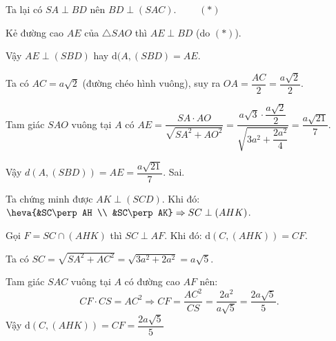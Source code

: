 \begin{ex}
{\begin{itemchoice}
			 Ta lại có $SA\perp BD$ nên $BD\perp (SAC).$ $ \qquad (*)$
			
			Kẻ đường cao $AE$ của $\triangle SAO$ thì $AE\perp BD$ (do $(*)$).
			
			Vậy $AE\perp (SBD)$ hay $\mathrm{d}(A,(SBD)=AE$.
			
			Ta có $AC=a\sqrt{2}$ (đường chéo hình vuông), suy ra $OA=\dfrac{AC}{2}=\dfrac{a\sqrt{2}}{2}$.
			
			Tam giác $SAO$ vuông tại $A$ có $AE=\dfrac{SA\cdot AO}{\sqrt{SA^2+AO^2}}=\dfrac{a\sqrt{3} \cdot \dfrac{a\sqrt{2}}{2}}{\sqrt{3a^2+\dfrac{2a^2}{4}}}=\dfrac{a\sqrt{21}}{7}$.
			
			Vậy $d(A,(SBD))=AE=\dfrac{a\sqrt{21}}{7}$.
			\itemch Sai.
			
				Ta chứng minh được $AK\perp (SCD)$. Khi đó: $\heva {&SC\perp AH \\ &SC\perp AK} \Rightarrow SC\perp (AHK)$.
			
			Gọi $F=SC\cap (AHK)$ thì $SC\perp AF$.
			Khi đó: $\mathrm{d}(C,(AHK))=CF$.
			
			Ta có $SC=\sqrt{SA^2+AC^2}=\sqrt{3a^2+2a^2}=a\sqrt{5}$.
			
			Tam giác $SAC$ vuông tại $A$ có đường cao $AF$ nên:
			\[CF\cdot CS=AC^2\Rightarrow CF=\dfrac{AC^2}{CS}=\dfrac{2a^2}{a\sqrt{5}}=\dfrac{2a\sqrt{5}}{5}.\]
			Vậy $\mathrm{d}(C,(AHK))=CF=\dfrac{2a\sqrt{5}}{5}$
		\end{itemchoice}
	
	}
\end{ex}
